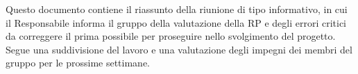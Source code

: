 Questo documento contiene il riassunto della riunione di tipo informativo, in cui il Responsabile informa il gruppo della valutazione della RP e degli errori critici da correggere il prima possibile per proseguire nello svolgimento del progetto. Segue una suddivisione del lavoro e una valutazione degli impegni dei membri del gruppo per le prossime settimane.
